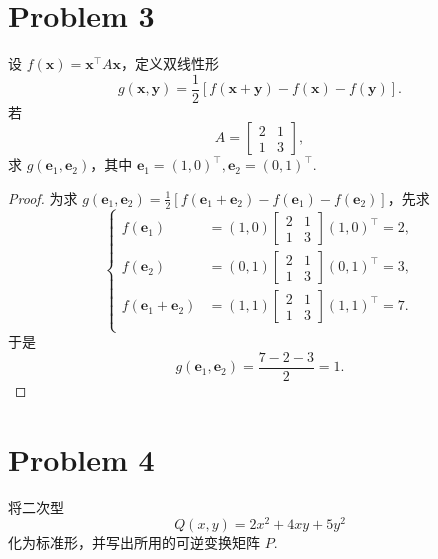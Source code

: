 \section*{Problem 3}

设 $f(\boldsymbol{x}) = \boldsymbol{x}^\top A \boldsymbol{x}$，定义双线性形
\[
g\left(\boldsymbol{x}, \boldsymbol{y}\right) = \frac{1}{2} \left[f \left(\boldsymbol{x} + \boldsymbol{y}\right) - f\left(\boldsymbol{x}\right) - f\left(\boldsymbol{y}\right)\right].
\]
若
\[
A =
\begin{bmatrix}
2 & 1 \\
1 & 3
\end{bmatrix},
\]
求 $g \left(\boldsymbol{e}_1, \boldsymbol{e}_2\right)$，其中 $\boldsymbol{e}_1 = \left(1, 0\right)^\top, \boldsymbol{e}_2 = \left(0, 1\right)^\top$.

\begin{proof}
为求 $g \left(\boldsymbol{e}_1, \boldsymbol{e}_2\right) = \frac{1}{2} \left[f \left(\boldsymbol{e}_1 + \boldsymbol{e}_2\right) - f\left(\boldsymbol{e}_1\right) - f\left(\boldsymbol{e}_2\right)\right]$，先求
\[
\begin{cases}
f \left(\boldsymbol{e}_1\right) &= \left(1, 0\right) \begin{bmatrix}
2 & 1 \\
1 & 3
\end{bmatrix} \left(1, 0\right)^\top = 2, \\
f \left(\boldsymbol{e}_2\right) &= \left(0, 1\right) \begin{bmatrix}
2 & 1 \\
1 & 3
\end{bmatrix} \left(0, 1\right)^\top = 3, \\
f \left(\boldsymbol{e}_1 + \boldsymbol{e}_2\right) &= \left(1, 1\right) \begin{bmatrix}
2 & 1 \\
1 & 3
\end{bmatrix} \left(1, 1\right)^\top = 7. \\
\end{cases}
\]
于是
\[
g \left(\boldsymbol{e}_1, \boldsymbol{e}_2\right) = \frac{7 - 2 - 3}{2} = \boxed{1}.
\]
\end{proof}

\section*{Problem 4}

将二次型
\[
Q \left(x, y\right) = 2x^2 + 4xy + 5y^2
\]
化为标准形，并写出所用的可逆变换矩阵 $P$.

